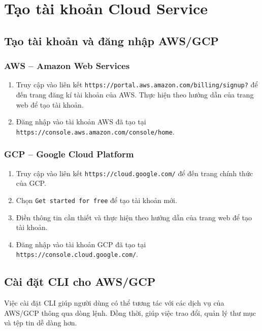 \chapter{Tạo tài khoản Cloud Service}
\label{Chapter1}

\section{Tạo tài khoản và đăng nhập AWS/GCP}
\subsection{AWS -- Amazon Web Services}
\begin{enumerate}
\item Truy cập vào liên kết \texttt{https://portal.aws.amazon.com/billing/signup?} để đến trang đăng kí tài khoản của AWS.
Thực hiện theo hướng dẫn của trang web để tạo tài khoản.

\item Đăng nhập vào tài khoản AWS đã tạo tại \texttt{https://console.aws.amazon.com/console/home}.
\end{enumerate}

\subsection{GCP -- Google Cloud Platform}
\begin{enumerate}
\item Truy cập vào liên kết \texttt{https://cloud.google.com/} để đến trang chính thức của GCP.
\item Chọn \texttt{Get started for free} để tạo tài khoản mới.
\item Điền thông tin cần thiết và thực hiện theo hướng dẫn của trang web để tạo tài khoản.
\item Đăng nhập vào tài khoản GCP đã tạo tại \texttt{https://console.cloud.google.com/}.
\end{enumerate}

\section{Cài đặt CLI cho AWS/GCP}
Việc cài đặt CLI giúp người dùng có thể tương tác với các dịch vụ của AWS/GCP thông qua dòng lệnh. Đồng thời, giúp việc trao đổi, quản lý thư mục và tệp tin dễ dàng hơn.
